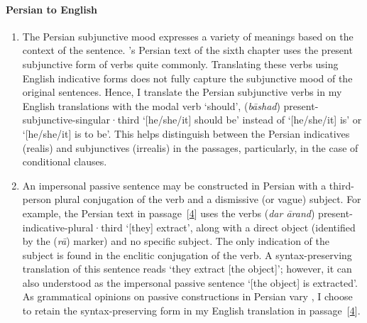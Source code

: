 \paragraph{Persian to English} 
\begin{enumerate}[topsep=0pt]
    \item The Persian subjunctive mood expresses a variety of meanings based on the context of the sentence. \MullaFarid's Persian text of the sixth chapter uses the present subjunctive form of verbs quite commonly. Translating these verbs using English indicative forms does not fully capture the subjunctive mood of the original sentences. Hence, I translate the Persian subjunctive verbs in my English translations with the modal verb `should', \eg {} (\textit{bāshad})  \acrshort{present}-\acrshort{subjunctive}-\acrshort{singular}·\acrshort{third} `[he/she/it] should be' instead of `[he/she/it] is' or `[he/she/it] is to be'. This helps distinguish between the Persian indicatives (realis) and subjunctives (irrealis) in the passages, particularly, in the case of conditional clauses.
                
    \item An impersonal passive sentence may be constructed in Persian with a third-person plural conjugation of the verb and a dismissive (or vague) subject. For example, the Persian text in passage~[\hyperlink{Ppass4}{4}] uses the verbs  (\textit{dar ārand}) \acrshort{present}-\acrshort{indicative}-\acrshort{plural}·\acrshort{third} `[they] extract', along with a direct object (identified by the  (\textit{rā}) marker) and no specific subject. The only indication of the subject is found in the enclitic conjugation of the verb. A syntax-preserving translation of this sentence reads `they extract [the object]'; however, it can also understood as the impersonal passive sentence `[the object] is extracted'. As grammatical opinions on passive constructions in Persian vary  \parencite[\eg \vid][261--264]{NematiPersianpassive}, I choose to retain the syntax-preserving form in my English translation in passage~[\hyperlink{PEpass4}{4}].
\end{enumerate}


